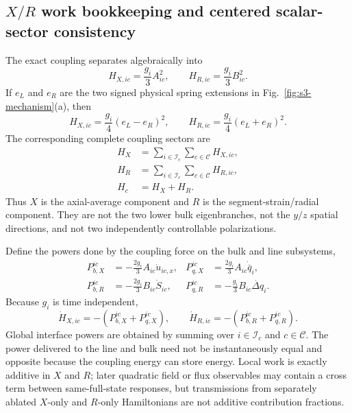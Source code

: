 \documentclass[10pt,aps,pre,reprint,floatfix,notitlepage,nofootinbib]{revtex4-2}
\newcommand{\Ic}{\mathcal I_c}
\newcommand{\Cc}{\mathcal C}
\begin{document}
\subsection{\texorpdfstring{$X/R$}{X/R} work bookkeeping and centered scalar-sector consistency}
\label{sec:s3-XR-work}

The exact coupling separates algebraically into
\begin{equation}
  H_{X,ic}=\frac{g_i}{3}A_{ic}^2,
  \qquad
  H_{R,ic}=\frac{g_i}{3}B_{ic}^2.
  \label{eq:s3-XR-energies}
\end{equation}
If $e_L$ and $e_R$ are the two signed physical spring extensions in Fig.~\ref{fig:s3-mechanism}(a), then
\begin{equation}
  H_{X,ic}=\frac{g_i}{4}(e_L-e_R)^2,
  \qquad
  H_{R,ic}=\frac{g_i}{4}(e_L+e_R)^2.
  \label{eq:s3-XR-physical-springs}
\end{equation}
The corresponding complete coupling sectors are
\begin{equation}
\begin{aligned}
 H_X&=\sum_{i\in\Ic}\sum_{c\in\Cc}H_{X,ic},\\
 H_R&=\sum_{i\in\Ic}\sum_{c\in\Cc}H_{R,ic},\\
 H_c&=H_X+H_R.
\end{aligned}
 \label{eq:s3-XR-global}
\end{equation}
Thus $X$ is the axial-average component and $R$ is the segment-strain/radial component.  They are not the two lower bulk eigenbranches, not the $y/z$ spatial directions, and not two independently controllable polarizations.

Define the powers done by the coupling force on the bulk and line subsystems,
\begin{align}
  P_{b,X}^{ic}&=-\frac{2g_i}{3}A_{ic}\dot u_{ic,x},
  &P_{q,X}^{ic}&=\frac{2g_i}{3}A_{ic}\dot{\bar q}_i,
  \label{eq:s3-X-powers}\\
  P_{b,R}^{ic}&=-\frac{2g_i}{3}B_{ic}\dot S_{ic},
  &P_{q,R}^{ic}&=-\frac{g_i}{3}B_{ic}\dot{\Delta q}_i.
  \label{eq:s3-R-powers}
\end{align}
Because $g_i$ is time independent,
\begin{equation}
  \dot H_{X,ic}=-(P_{b,X}^{ic}+P_{q,X}^{ic}),
  \qquad
  \dot H_{R,ic}=-(P_{b,R}^{ic}+P_{q,R}^{ic}).
  \label{eq:s3-local-work}
\end{equation}
Global interface powers are obtained by summing over $i\in\Ic$ and $c\in\Cc$.  The power delivered to the line and bulk need not be instantaneously equal and opposite because the coupling energy can store energy.  Local work is exactly additive in $X$ and $R$; later quadratic field or flux observables may contain a cross term between same-full-state responses, but transmissions from separately ablated $X$-only and $R$-only Hamiltonians are not additive contribution fractions.
\end{document}
